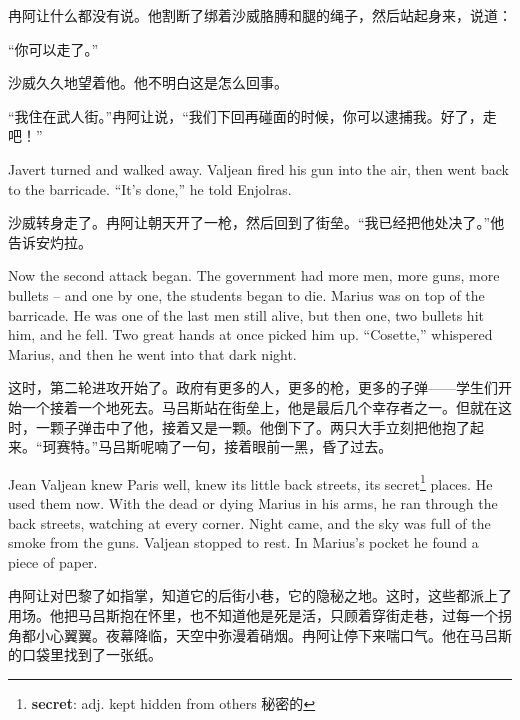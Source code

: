 \documentclass[fontset=ubuntu, zihao=5]{ctexart}
\begin{document}
\begin{paracol}{2}
\switchcolumn

冉阿让什么都没有说。他割断了绑着沙威胳膊和腿的绳子，然后站起身来，说道：

“你可以走了。”

沙威久久地望着他。他不明白这是怎么回事。

“我住在武人街。”冉阿让说，“我们下回再碰面的时候，你可以逮捕我。好了，走吧！”

\switchcolumn*

Javert turned and walked away. Valjean fired his gun into the air, then went back to the barricade. ``It's done,'' he told Enjolras.

\switchcolumn

沙威转身走了。冉阿让朝天开了一枪，然后回到了街垒。“我已经把他处决了。”他告诉安灼拉。

\switchcolumn*

Now the second attack began. The government had more men, more guns, more bullets – and one by one, the students began to die. Marius was on top of the barricade. He was one of the last men still alive, but then one, two bullets hit him, and he fell. Two great hands at once picked him up. ``Cosette,'' whispered Marius, and then he went into that dark night.

\switchcolumn

这时，第二轮进攻开始了。政府有更多的人，更多的枪，更多的子弹——学生们开始一个接着一个地死去。马吕斯站在街垒上，他是最后几个幸存者之一。但就在这时，一颗子弹击中了他，接着又是一颗。他倒下了。两只大手立刻把他抱了起来。“珂赛特。”马吕斯呢喃了一句，接着眼前一黑，昏了过去。

\switchcolumn*

\sectionbreak

Jean Valjean knew Paris well, knew its little back streets, its
secret\footnote{\textbf{secret}: adj. kept hidden from others 秘密的}
places. He used them now. With the dead or dying Marius in his arms, he ran
through the back streets, watching at every corner. Night came, and the sky
was full of the smoke from the guns. Valjean stopped to rest. In Marius's
pocket he found a piece of paper.

\switchcolumn

\sectionbreak

冉阿让对巴黎了如指掌，知道它的后街小巷，它的隐秘之地。这时，这些都派上了用场。他把马吕斯抱在怀里，也不知道他是死是活，只顾着穿街走巷，过每一个拐角都小心翼翼。夜幕降临，天空中弥漫着硝烟。冉阿让停下来喘口气。他在马吕斯的口袋里找到了一张纸。

\switchcolumn*


\end{paracol}
\end{document}
